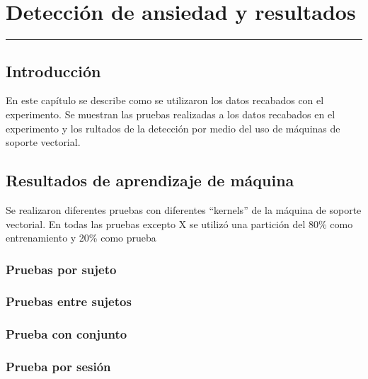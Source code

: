 
\chapter{Detecci\'on de ansiedad y resultados}\label{capit:cap4}
\vspace{-2.0325ex}%
\noindent
\rule{\textwidth}{0.5pt}
\vspace{-5.5ex}%
\newcommand{\pushline}{\Indp}%

\section{Introducci\'on}\label{cap4:intro}
En este cap\'itulo se describe como se utilizaron los datos recabados con el experimento. Se muestran las pruebas realizadas a los datos recabados en el experimento y los rultados de la detecci\'on por medio del uso de m\'aquinas de soporte vectorial.





\section{Resultados de aprendizaje de m\'aquina}
Se realizaron diferentes pruebas con diferentes ``kernels'' de la m\'aquina de soporte vectorial. En todas las pruebas excepto X se utiliz\'o una partici\'on del 80\% como entrenamiento y 20\% como prueba
\subsection{Pruebas por sujeto}
\subsection{Pruebas entre sujetos}
\subsection{Prueba con conjunto}
\subsection{Prueba por sesi\'on}


\newpage
